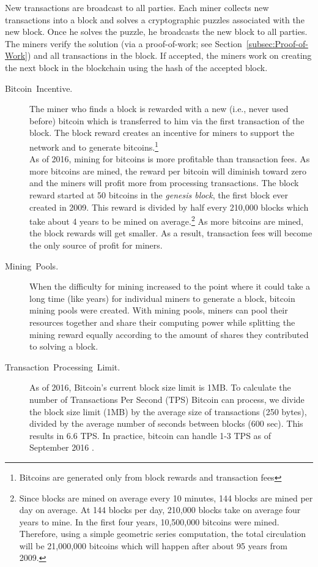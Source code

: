 \documentclass[11pt]{article}
\theoremstyle{plain}
\begin{document}
New transactions are broadcast to all parties. Each miner collects
new transactions into a block and solves a cryptographic puzzles associated
with the new block. Once he solves the puzzle, he broadcasts the new
block to all parties. The miners verify the solution (via a proof-of-work;
see Section~\ref{subsec:Proof-of-Work}) and all transactions in
the block. If accepted, the miners work on creating the next block
in the blockchain using the hash of the accepted block. 
\begin{description}
	\item [{Bitcoin~Incentive.}] The miner who finds a block is rewarded with
	a new (i.e., never used before) bitcoin which is transferred to him
	via the first transaction of the block. The block reward creates an
	incentive for miners to support the network and to generate bitcoins.\footnote{Bitcoins are generated only from block rewards and transaction fees}\\
	As of 2016, mining for bitcoins is more profitable than transaction
	fees. As more bitcoins are mined, the reward per bitcoin will diminish
	toward zero and the miners will profit more from processing transactions.
	The block reward started at 50 bitcoins in the \emph{genesis block},
	the first block ever created in 2009. This reward is divided by half
	every 210,000 blocks which take about 4 years to be mined on average.\footnote{Since blocks are mined on average every 10 minutes, 144 blocks are
		mined per day on average. At 144 blocks per day, 210,000 blocks take
		on average four years to mine. In the first four years, 10,500,000
		bitcoins were mined. Therefore, using a simple geometric series computation,
		the total circulation will be 21,000,000 bitcoins which will happen
		after about 95 years from 2009. } As more bitcoins are mined, the block rewards will get smaller. As
	a result, transaction fees will become the only source of profit for
	miners.
	\item [{Mining~Pools.}] When the difficulty for mining increased to the
	point where it could take a long time (like years) for individual
	miners to generate a block, bitcoin mining pools were created. With
	mining pools, miners can pool their resources together and share their
	computing power while splitting the mining reward equally according
	to the amount of shares they contributed to solving a block.
	\item [{Transaction~Processing~Limit.}] As of 2016, Bitcoin's current
	block size limit is 1MB. To calculate the number of Transactions Per
	Second (TPS) Bitcoin can process, we divide the block size limit (1MB)
	by the average size of transactions (250 bytes), divided by the average
	number of seconds between blocks (600 sec). This results in 6.6 TPS.
	In practice, bitcoin can handle 1-3 TPS as of September 2016 \cite{Blockchain:TransPerBlock}.
\end{description}
\end{document}
